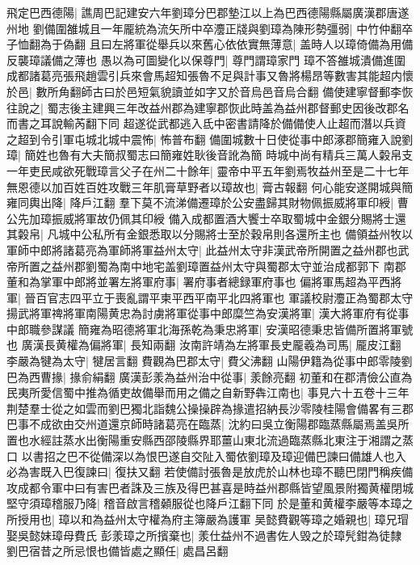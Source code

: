 飛定巴西德陽|{
	譙周巴記建安六年劉璋分巴郡墊江以上為巴西德陽縣屬廣漢郡唐遂州地}
劉備圍雒城且一年龎統為流矢所中卒灋正牋與劉璋為陳形勢彊弱|{
	中竹仲翻卒子恤翻為于偽翻}
且曰左將軍從舉兵以來舊心依依實無薄意|{
	盖時人以璋倚備為用備反襲璋議備之薄也}
愚以為可圖變化以保尊門|{
	尊門謂璋家門}
璋不答雒城潰備進圍成都諸葛亮張飛趙雲引兵來會馬超知張魯不足與計事又魯將楊昂等數害其能超内懷於邑|{
	數所角翻師古曰於邑短氣貌讀並如字又於音烏邑音烏合翻}
備使建寧督郵李恢往說之|{
	蜀志後主建興三年改益州郡為建寧郡恢此時盖為益州郡督郵史因後改郡名而書之耳說輸芮翻下同}
超遂從武都逃入氐中密書請降於備備使人止超而潛以兵資之超到令引軍屯城北城中震怖|{
	怖普布翻}
備圍城數十日使從事中郎涿郡簡雍入說劉璋|{
	簡姓也魯有大夫簡叔蜀志曰簡雍姓耿後音訛為簡}
時城中尚有精兵三萬人糓帛支一年吏民咸欲死戰璋言父子在州二十餘年|{
	靈帝中平五年劉焉牧益州至是二十七年}
無恩德以加百姓百姓攻戰三年肌膏草野者以璋故也|{
	膏古報翻}
何心能安遂開城與簡雍同輿出降|{
	降戶江翻}
羣下莫不流涕備遷璋於公安盡歸其財物佩振威將軍印綬|{
	曹公先加璋振威將軍故仍佩其印綬}
備入成都置酒大饗士卒取蜀城中金銀分賜將士還其糓帛|{
	凡城中公私所有金銀悉取以分賜將士至於穀帛則各還所主也}
備領益州牧以軍師中郎將諸葛亮為軍師將軍益州太守|{
	此益州太守非漢武帝所開置之益州郡也武帝所置之益州郡劉蜀為南中地宅盖劉璋置益州太守與蜀郡太守並治成都郭下}
南郡董和為掌軍中郎將並署左將軍府事|{
	署府事者總録軍府事也}
偏將軍馬超為平西將軍|{
	晉百官志四平立于喪亂謂平柬平西平南平北四將軍也}
軍議校尉灋正為蜀郡太守揚武將軍禆將軍南陽黄忠為討虜將軍從事中郎糜竺為安漢將軍|{
	漢大將軍府有從事中郎職參謀議}
簡雍為昭德將軍北海孫乾為秉忠將軍|{
	安漢昭德秉忠皆備所置將軍號也}
廣漢長黄權為偏將軍|{
	長知兩翻}
汝南許靖為左將軍長史龎羲為司馬|{
	龎皮江翻}
李嚴為犍為太守|{
	犍居言翻}
費觀為巴郡太守|{
	費父沸翻}
山陽伊籍為從事中郎零陵劉巴為西曹掾|{
	掾俞絹翻}
廣漢彭羕為益州治中從事|{
	羕餘亮翻}
初董和在郡清儉公直為民夷所愛信蜀中推為循吏故備舉而用之備之自新野犇江南也|{
	事見六十五卷十三年}
荆楚羣士從之如雲而劉巴獨北詣魏公操操辟為掾遣招納長沙零陵桂陽會備畧有三郡巴事不成欲由交州道還京師時諸葛亮在臨蒸|{
	沈約曰吳立衡陽郡臨蒸縣屬焉盖吳所置也水經註蒸水出衡陽重安縣西邵陵縣界耶薑山東北流過臨蒸縣北東注于湘謂之蒸口}
以書招之巴不從備深以為恨巴遂自交阯入蜀依劉璋及璋迎備巴諫曰備雄人也入必為害既入巴復諫曰|{
	復扶又翻}
若使備討張魯是放虎於山林也璋不聽巴閉門稱疾備攻成都令軍中曰有害巴者誅及三族及得巴甚喜是時益州郡縣皆望風景附獨黄權閉城堅守須璋稽服乃降|{
	稽音啟言稽顙服從也降戶江翻下同}
於是董和黄權李嚴等本璋之所授用也|{
	璋以和為益州太守權為府主簿嚴為護軍}
吴懿費觀等璋之婚親也|{
	璋兄瑁娶吳懿妹璋母費氏}
彭羕璋之所擯棄也|{
	羕仕益州不過書佐人毁之於璋髠鉗為徒隸}
劉巴宿昔之所忌恨也備皆處之顯任|{
	處昌呂翻}
